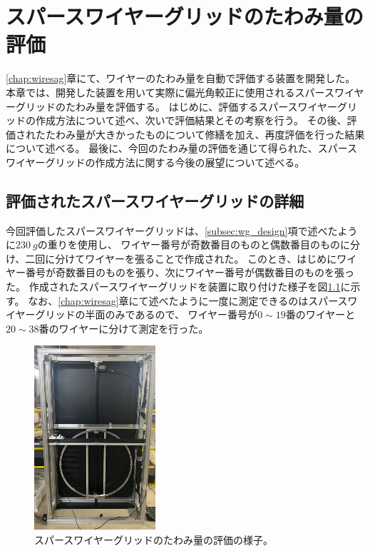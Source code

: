 \documentclass[../../main.tex]{subfiles}
\begin{document}
\chapter{スパースワイヤーグリッドのたわみ量の評価}
\label{chap:wiresag_swg}
\ref{chap:wiresag}章にて、ワイヤーのたわみ量を自動で評価する装置を開発した。
本章では、開発した装置を用いて実際に偏光角較正に使用されるスパースワイヤーグリッドのたわみ量を評価する。
はじめに、評価するスパースワイヤーグリッドの作成方法について述べ、次いで評価結果とその考察を行う。
その後、評価されたたわみ量が大きかったものについて修繕を加え、再度評価を行った結果について述べる。
最後に、今回のたわみ量の評価を通じて得られた、スパースワイヤーグリッドの作成方法に関する今後の展望について述べる。

\section{評価されたスパースワイヤーグリッドの詳細}
今回評価したスパースワイヤーグリッドは、\ref{subsec:wg_design}項で述べたように$\SI{230}{g}$の重りを使用し、
ワイヤー番号が奇数番目のものと偶数番目のものに分け、二回に分けてワイヤーを張ることで作成された。
このとき、はじめにワイヤー番号が奇数番目のものを張り、次にワイヤー番号が偶数番目のものを張った。
作成されたスパースワイヤーグリッドを装置に取り付けた様子を図\ref{fig:wiresag_swg_sparse_wiregrid}に示す。
なお、\ref{chap:wiresag}章にて述べたように一度に測定できるのはスパースワイヤーグリッドの半面のみであるので、
ワイヤー番号が$0\sim19$番のワイヤーと$20\sim38$番のワイヤーに分けて測定を行った。
\begin{figure}[H]
    \centering
    \includegraphics[width=0.4\textwidth]{wiresag_swg/wiresag_sparse_wiregrid.pdf}
    \caption{スパースワイヤーグリッドのたわみ量の評価の様子。}
    \label{fig:wiresag_swg_sparse_wiregrid}
\end{figure}
\end{document}
